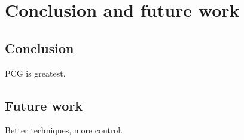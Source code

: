 \section{Conclusion and future work}
\subsection{Conclusion}
PCG is greatest.

\subsection{Future work}
Better techniques, more control.